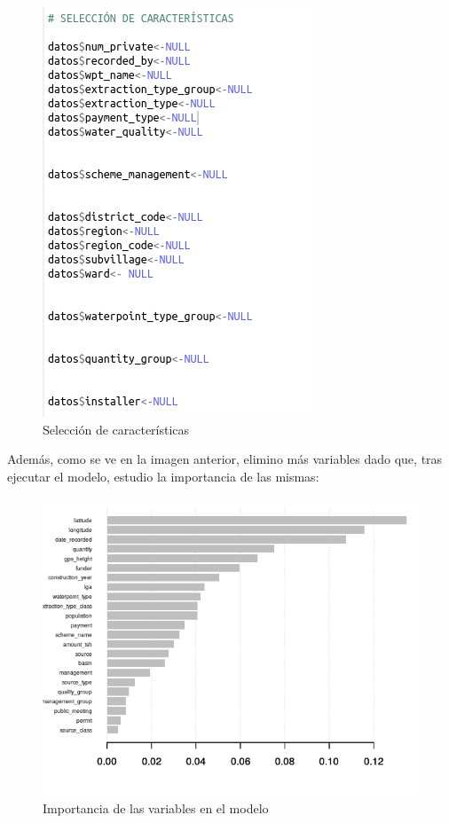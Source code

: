\begin{figure}[H] %
	\centering
	\includegraphics[scale=0.6]{selec-carac.png}  %
	\caption{Selección de características} 
	\label{fig:selec-carac}
\end{figure}



Además, como se ve en la imagen anterior, elimino más variables dado que, tras ejecutar el modelo, estudio la importancia de las mismas:


\begin{figure}[H] %
	\centering
	\includegraphics[scale=0.7]{importancia-variables.png}  %
	\caption{Importancia de las variables en el modelo} 
	\label{fig:importancia}
\end{figure}

